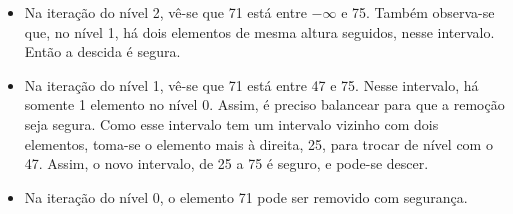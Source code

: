 \documentclass[paper=a4, fontsize=11pt]{scrartcl} %
\numberwithin{equation}{section}
\numberwithin{figure}{section}
\numberwithin{table}{section}
\numberwithin{definition}{section}
\numberwithin{theorem}{section}
\numberwithin{property}{section}
\numberwithin{proposition}{section}
\begin{document}
\begin{itemize}
  \item Na iteração do nível 2, vê-se que 71 está entre $-\infty$ e  75. Também observa-se que, no nível
  1, há dois elementos de mesma altura seguidos, nesse intervalo. Então a descida é segura.
  \item Na iteração do nível 1, vê-se que 71 está entre 47 e 75. Nesse intervalo, há somente 1 elemento
  no nível 0. Assim, é preciso balancear para que a remoção seja segura. Como esse intervalo tem um 
  intervalo vizinho com dois elementos, toma-se o elemento mais à direita, 25, para trocar de nível com
  o 47. Assim, o novo intervalo, de 25 a 75 é seguro, e pode-se descer.
  \item Na iteração do nível 0, o elemento 71 pode ser removido com segurança.

\end{itemize}
\end{document}
